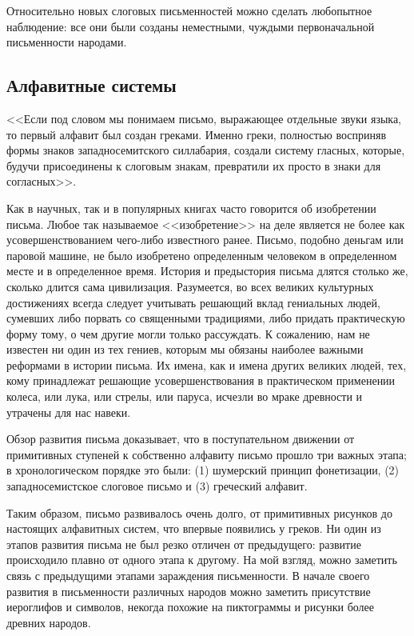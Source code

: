   Относительно новых слоговых письменностей можно сделать любопытное
  наблюдение: все они были созданы неместными, чуждыми первоначальной
  письменности народами.
  
  \subsection{Алфавитные системы}
  
  <<Если под словом \grqq мы понимаем письмо, выражающее отдельные
  звуки языка, то первый алфавит был создан греками. Именно греки, полностью
  восприняв формы знаков западносемитского силлабария, создали систему гласных,
  которые, будучи присоединены к слоговым знакам, превратили их просто в знаки
  для согласных>>.~\cite{bib:1}
  
  Как в научных, так и в популярных книгах часто говорится об изобретении
  письма. Любое так называемое <<изобретение>> на деле является не более как
  усовершенствованием чего-либо известного ранее. Письмо, подобно деньгам или
  паровой машине, не было изобретено определенным человеком в определенном
  месте и в определенное время. История и предыстория письма длятся столько же,
  сколько длится сама цивилизация. Разумеется, во всех великих культурных
  достижениях всегда следует учитывать решающий вклад гениальных людей,
  сумевших либо порвать со священными традициями, либо придать практическую
  форму тому, о чем другие могли только рассуждать. К сожалению, нам не
  известен ни один из тех гениев, которым мы обязаны наиболее важными реформами
  в истории письма. Их имена, как и имена других великих людей, тех, кому
  принадлежат решающие усовершенствования в практическом применении колеса, или
  лука, или стрелы, или паруса, исчезли во мраке древности и утрачены для нас
  навеки.
  
  Обзор развития письма доказывает, что в поступательном движении от
  примитивных ступеней к собственно алфавиту письмо прошло три важных этапа; в
  хронологическом порядке это были: (1) шумерский принцип фонетизации, (2)
  западносемистское слоговое письмо и (3) греческий алфавит.
  
  Таким образом, письмо развивалось очень долго, от примитивных рисунков до
  настоящих алфавитных систем, что впервые появились у греков. Ни один из
  этапов развития письма не был резко отличен от предыдущего: развитие
  происходило плавно от одного этапа к другому. На мой взгляд, можно заметить
  связь с предыдущими этапами зараждения письменности. В начале своего развития
  в письменности различных народов можно заметить присутствие иероглифов и
  символов, некогда похожие на пиктограммы и рисунки более древних народов.
  
